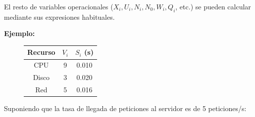 \documentclass[12pt,spanish]{article}
\begin{document}
El resto de variables operacionales ($X_i, U_i, N_i, N_0, W_i, Q_i$, etc.) se pueden calcular mediante sus expresiones habituales.

\textbf{Ejemplo:\\}

\begin{figure}[H]
	\centering
	\begin{tabular}{|c|c|c|}
		\hline
		Recurso & $V_i$ & $S_i$ (s) \\
		\hline
		CPU & 9 & 0.010 \\
		\hline
		Disco & 3 & 0.020 \\
		\hline
		Red & 5 & 0.016 \\
		\hline
	\end{tabular}
\end{figure}

Suponiendo que la tasa de llegada de peticiones al servidor es de 5 peticiones/s:
\end{document}
